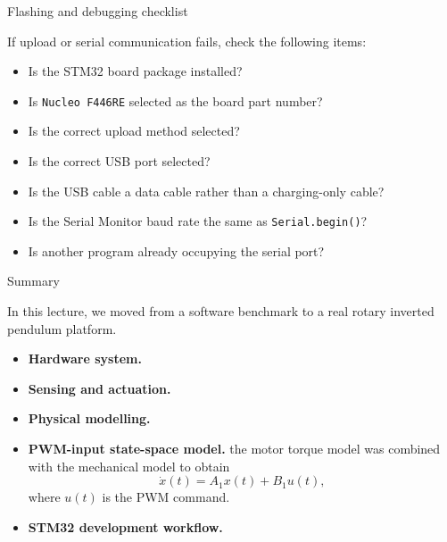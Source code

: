 \documentclass[aspectratio=169]{beamer}
\begin{document}
\begin{frame}{Flashing and debugging checklist}

If upload or serial communication fails, check the following items:

\begin{itemize}
    \item Is the STM32 board package installed?
    \item Is \texttt{Nucleo F446RE} selected as the board part number?
    \item Is the correct upload method selected?
    \item Is the correct USB port selected?
    \item Is the USB cable a data cable rather than a charging-only cable?
    \item Is the Serial Monitor baud rate the same as \texttt{Serial.begin()}?
    \item Is another program already occupying the serial port?
\end{itemize}

\vspace{0.2cm}



\end{frame}

\begin{frame}{Summary}

In this lecture, we moved from a software benchmark to a real rotary inverted pendulum platform.

\vspace{0.2cm}

\begin{itemize}
    \item \textbf{Hardware system.}
   

    \item \textbf{Sensing and actuation.}
    
    \item \textbf{Physical modelling.}
    
    \item \textbf{PWM-input state-space model.}
    the motor torque model was combined with the mechanical model to obtain
    \[
    \dot{x}(t)=A_1x(t)+B_1u(t),
    \]
    where \(u(t)\) is the PWM command.

    \item \textbf{STM32 development workflow.}
   
\end{itemize}

\end{frame}
\end{document}
